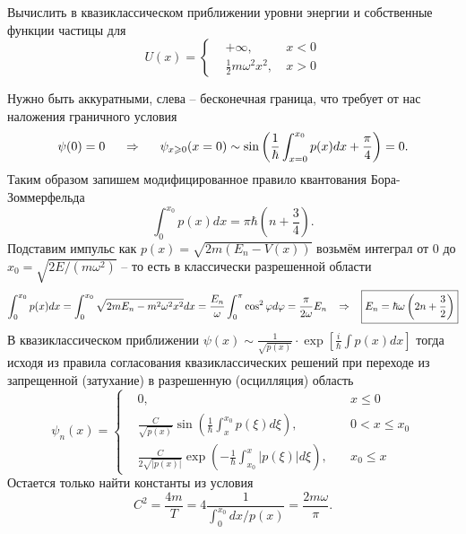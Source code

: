 \begin{leftrules}
	Вычислить в квазиклассическом приближении уровни энергии и собственные функции частицы для
	\begin{equation*}
		U(x) = \left\{
		\begin{aligned}
			&+ \infty, \ &x<0\\
			&\tfrac{1}{2} m \omega^2 x^2, \ &x>0
		\end{aligned}\right.
	\end{equation*}
\end{leftrules}
Нужно быть аккуратными, слева -- бесконечная граница, что требует от нас наложения граничного условия
\begin{equation*}
	\psi(0) = 0 
	\hspace{0.5 cm}
	\Rightarrow
	\hspace{0.5 cm}
	\psi_{x \geq 0}(x=0) \sim \sin\left(\frac{1}{\hbar} \int_{x=0}^{x_0} p(x) d x + \frac{\pi}{4}\right) = 0.
\end{equation*}
Таким образом запишем модифицированное правило квантования Бора-Зоммерфельда
\begin{equation*}
	\int_0^{x_0} p(x) d x = \pi \hbar \left(n + \frac{3}{4}\right).
\end{equation*}
Подставим импульс как $p(x) = \sqrt{2m(E_n - V(x))}$ возьмём интеграл от $0$ до $x_0 = \sqrt{2E/(m \omega^2)}$ -- то есть в классически разрешенной области
\begin{equation*}
	\int_0^{x_0} p(x) d x = \int_0^{x_0} \sqrt{2m E_n -  m^2 \omega^2 x^2} d x = \frac{E_n}{\omega} \int_0^{\pi} \cos^2 \varphi d \varphi = \frac{\pi}{2 \omega} E_n
	\hspace{0.3 cm}
	\Rightarrow
	\hspace{0.3 cm}
	\boxed{E_n = \hbar \omega  \left(2n + \frac{3}{2}\right)}
\end{equation*}
В квазиклассическом приближении $\psi(x) \sim \tfrac{1}{\sqrt{p(x)}} \cdot \exp[\frac{i}{\hbar} \int p(x) dx]$ тогда исходя из правила согласования квазиклассических решений при переходе из запрещенной (затухание) в разрешенную (осцилляция) область 
\begin{equation*}
	\psi_n(x) = \left\{
	\begin{aligned}
		&0, \phantom{\frac{239}{ftsh}} &\ & x\leq 0\\
		&\frac{C}{\sqrt{p(x)}} \sin \left(\frac{1}{\hbar} \int_{x}^{x_0} p(\xi) d\xi\right), &\ & 0<x \leq x_0\\
		&\frac{C}{2\sqrt{|p(x)|}} \exp \left(-\frac{1}{\hbar} \int_{x_0}^{x} |p(\xi)| d\xi\right), &\ & x_0 \leq x
	\end{aligned}\right. 
\end{equation*}
Остается только найти константы из условия
\begin{equation*}
	C^2 = \frac{4 m}{T} = 4\frac{1}{\int_{0}^{x_0} dx / p(x)} = \frac{2 m \omega}{\pi}.
\end{equation*}